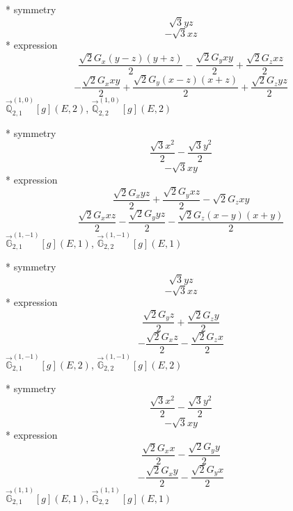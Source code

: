 \documentclass[fleqn,8pt]{jsarticle}
\begin{document}
\noindent\quad ** symmetry
\begin{dmath*}
\sqrt{3} y z
\end{dmath*}
\begin{dmath*}
- \sqrt{3} x z
\end{dmath*}
\noindent\quad ** expression
\begin{dmath*}
\frac{\sqrt{2} G_{x} \left(y - z\right) \left(y + z\right)}{2} - \frac{\sqrt{2} G_{y} x y}{2} + \frac{\sqrt{2} G_{z} x z}{2}
\end{dmath*}
\begin{dmath*}
- \frac{\sqrt{2} G_{x} x y}{2} + \frac{\sqrt{2} G_{y} \left(x - z\right) \left(x + z\right)}{2} + \frac{\sqrt{2} G_{z} y z}{2}
\end{dmath*}
\noindent\quad $\vec{\mathbb{Q}}_{2,1}^{(1,0)}[g](E,2)$, $\vec{\mathbb{Q}}_{2,2}^{(1,0)}[g](E,2)$

\noindent\quad ** symmetry
\begin{dmath*}
\frac{\sqrt{3} x^{2}}{2} - \frac{\sqrt{3} y^{2}}{2}
\end{dmath*}
\begin{dmath*}
- \sqrt{3} x y
\end{dmath*}
\noindent\quad ** expression
\begin{dmath*}
\frac{\sqrt{2} G_{x} y z}{2} + \frac{\sqrt{2} G_{y} x z}{2} - \sqrt{2} G_{z} x y
\end{dmath*}
\begin{dmath*}
\frac{\sqrt{2} G_{x} x z}{2} - \frac{\sqrt{2} G_{y} y z}{2} - \frac{\sqrt{2} G_{z} \left(x - y\right) \left(x + y\right)}{2}
\end{dmath*}
\noindent\quad $\vec{\mathbb{G}}_{2,1}^{(1,-1)}[g](E,1)$, $\vec{\mathbb{G}}_{2,2}^{(1,-1)}[g](E,1)$

\noindent\quad ** symmetry
\begin{dmath*}
\sqrt{3} y z
\end{dmath*}
\begin{dmath*}
- \sqrt{3} x z
\end{dmath*}
\noindent\quad ** expression
\begin{dmath*}
\frac{\sqrt{2} G_{y} z}{2} + \frac{\sqrt{2} G_{z} y}{2}
\end{dmath*}
\begin{dmath*}
- \frac{\sqrt{2} G_{x} z}{2} - \frac{\sqrt{2} G_{z} x}{2}
\end{dmath*}
\noindent\quad $\vec{\mathbb{G}}_{2,1}^{(1,-1)}[g](E,2)$, $\vec{\mathbb{G}}_{2,2}^{(1,-1)}[g](E,2)$

\noindent\quad ** symmetry
\begin{dmath*}
\frac{\sqrt{3} x^{2}}{2} - \frac{\sqrt{3} y^{2}}{2}
\end{dmath*}
\begin{dmath*}
- \sqrt{3} x y
\end{dmath*}
\noindent\quad ** expression
\begin{dmath*}
\frac{\sqrt{2} G_{x} x}{2} - \frac{\sqrt{2} G_{y} y}{2}
\end{dmath*}
\begin{dmath*}
- \frac{\sqrt{2} G_{x} y}{2} - \frac{\sqrt{2} G_{y} x}{2}
\end{dmath*}
\noindent\quad $\vec{\mathbb{G}}_{2,1}^{(1,1)}[g](E,1)$, $\vec{\mathbb{G}}_{2,2}^{(1,1)}[g](E,1)$
\end{document}

